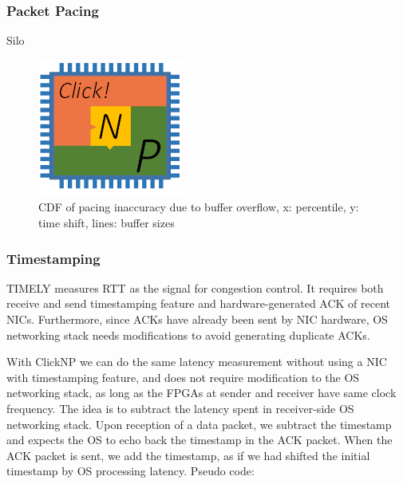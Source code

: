{\subsubsection{Packet Pacing}

Silo \cite{jang2015silo}

\begin{figure}[h!]
	\centering
	\includegraphics[width=0.6\columnwidth]{image/logo}
	\vspace{-0.15in}
	\caption{CDF of pacing inaccuracy due to buffer overflow, x: percentile, y: time shift, lines: buffer sizes}
	\vspace{-0.15in}
	\label{clicknp:fig:PacingAccuracy}
\end{figure}

\subsubsection{Timestamping}

TIMELY \cite{mittal2015timely} measures RTT as the signal for congestion control. It requires both receive and send timestamping feature and hardware-generated ACK of recent NICs. Furthermore, since ACKs have already been sent by NIC hardware, OS networking stack needs modifications to avoid generating duplicate ACKs.

With ClickNP we can do the same latency measurement without using a NIC with timestamping feature, and does not require modification to the OS networking stack, as long as the FPGAs at sender and receiver have same clock frequency. The idea is to subtract the latency spent in receiver-side OS networking stack. Upon reception of a data packet, we subtract the timestamp and expects the OS to echo back the timestamp in the ACK packet. When the ACK packet is sent, we add the timestamp, as if we had shifted the initial timestamp by OS processing latency. Pseudo code:

}
